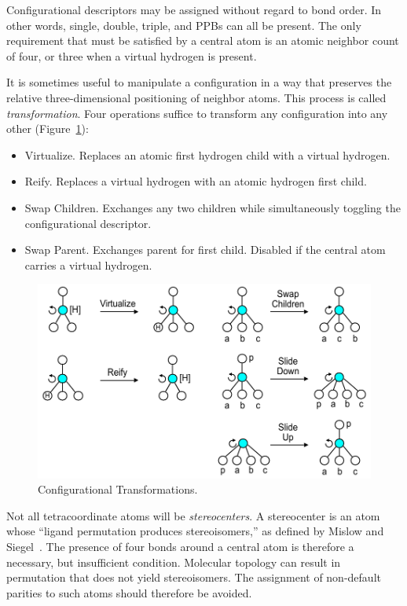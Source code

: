 \documentclass{article}
\begin{document}
Configurational descriptors may be assigned without regard to bond order. In other words, single, double, triple, and PPBs can all be present. The only requirement that must be satisfied by a central atom is an atomic neighbor count of four, or three when a virtual hydrogen is present.

It is sometimes useful to manipulate a configuration in a way that preserves the relative three-dimensional positioning of neighbor atoms. This process is called \textit{transformation}. Four operations suffice to transform any configuration into any other (Figure~\ref{fig:configurational-transformations}):

\begin{itemize}
    \item{Virtualize. Replaces an atomic first hydrogen child with a virtual hydrogen.}
    \item{Reify. Replaces a virtual hydrogen with an atomic hydrogen first child.}
    \item{Swap Children. Exchanges any two children while simultaneously toggling the configurational descriptor.}
    \item{Swap Parent. Exchanges parent for first child. Disabled if the central atom carries a virtual hydrogen.}
\end{itemize}

\begin{figure}
    \centering
    \includegraphics[width=\columnwidth]{configurational-transformations.pdf}
    \caption{Configurational Transformations.}
    \label{fig:configurational-transformations}
\end{figure}

Not all tetracoordinate atoms will be \textit{stereocenters}. A stereocenter is an atom whose \enquote{ligand permutation produces stereoisomers,} as defined by Mislow and Siegel~\cite{mislow:1984}. The presence of four bonds around a central atom is therefore a necessary, but insufficient condition. Molecular topology can result in permutation that does not yield stereoisomers. The assignment of non-default parities to such atoms should therefore be avoided.
\end{document}
